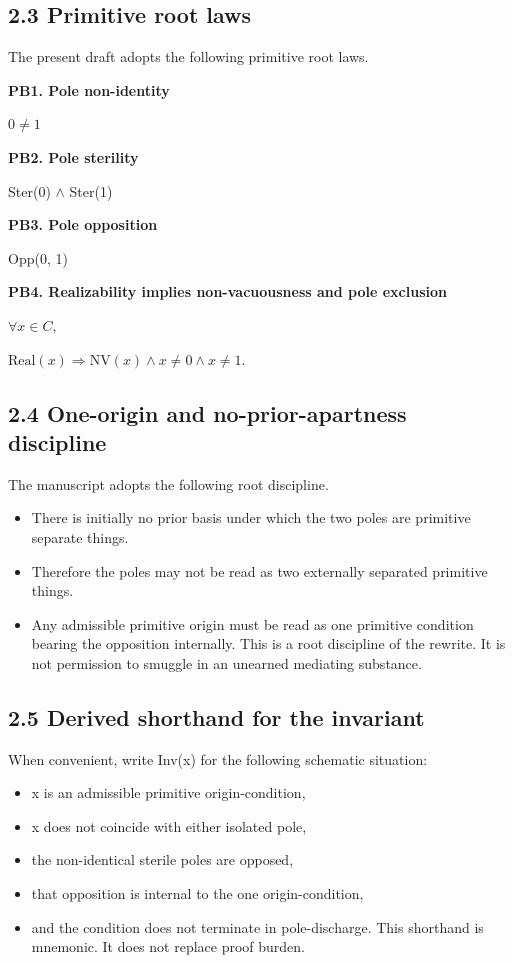 \documentclass[11pt]{article}
\begin{document}
\subsection{2.3 Primitive root laws}\label{primitive-root-laws}

The present draft adopts the following primitive root laws.

\textbf{PB1. Pole non-identity}

$0 \neq 1$

\textbf{PB2. Pole sterility}

Ster(0) $\wedge$ Ster(1)

\textbf{PB3. Pole opposition}

Opp(0, 1)

\textbf{PB4. Realizability implies non-vacuousness and pole exclusion}

$\forall x \in C,$

$\mathrm{Real}(x) \Rightarrow \mathrm{NV}(x) \wedge x \neq 0 \wedge x \neq 1.$

\subsection{2.4 One-origin and no-prior-apartness discipline}\label{one-origin-and-no-prior-apartness-discipline}

The manuscript adopts the following root discipline.

\begin{itemize}
\item
  There is initially no prior basis under which the two poles are primitive separate things.
\item
  Therefore the poles may not be read as two externally separated primitive things.
\item
  Any admissible primitive origin must be read as one primitive condition bearing the opposition internally. This is a root discipline of the rewrite. It is not permission to smuggle in an unearned mediating substance.
\end{itemize}

\subsection{2.5 Derived shorthand for the invariant}\label{derived-shorthand-for-the-invariant}

When convenient, write Inv(x) for the following schematic situation:

\begin{itemize}
\item
  x is an admissible primitive origin-condition,
\item
  x does not coincide with either isolated pole,
\item
  the non-identical sterile poles are opposed,
\item
  that opposition is internal to the one origin-condition,
\item
  and the condition does not terminate in pole-discharge. This shorthand is mnemonic. It does not replace proof burden.
\end{itemize}
\end{document}
